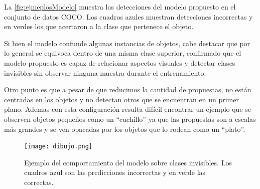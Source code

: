 La \autoref{fig:ejmeplosModelo} muestra las detecciones del modelo propuesto en el conjunto de datos COCO. Los cuadros azules muestran detecciones incorrectas y en verdes los que acertaron a la clase que pertenece el objeto. 

Si bien el modelo confunde algunas instancias de objetos, cabe destacar que por lo general se equivoca dentro de una misma clase superior, confirmado que el modelo propuesto es capaz de relacionar aspectos visuales y detectar clases invisibles sin observar ninguna muestra durante el entrenamiento. 

Otro punto es que a pesar de que reducimos la cantidad de propuestas, no están centradas en los objetos y no detectan otros que se encuentran en un primer plano. Ademas con esta configuración resulta difícil encontrar un ejemplo que se observen objetos pequeños como  un ``cuchillo'' ya que las propuestas son a escalas más grandes y se ven opacadas por los objetos que lo rodean como un ``plato''.

\begin{figure}[]
	\texttt{[image: dibujo.png]}
	\caption{Ejemplo del comportamiento del modelo sobre clases invisibles. Los cuadros azul son las predicciones incorrectas y en verde las correctas.}
	\label{fig:ejmeplosModelo}
\end{figure}